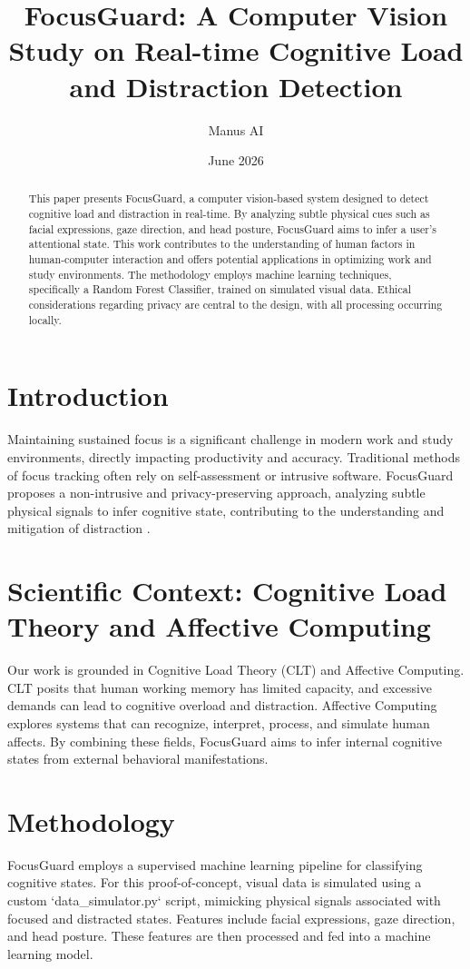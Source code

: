 \documentclass{article}
\title{FocusGuard: A Computer Vision Study on Real-time Cognitive Load and Distraction Detection}
\author{Manus AI}
\date{June 2026}
\begin{document}
\maketitle

\begin{abstract}
This paper presents FocusGuard, a computer vision-based system designed to detect cognitive load and distraction in real-time. By analyzing subtle physical cues such as facial expressions, gaze direction, and head posture, FocusGuard aims to infer a user's attentional state. This work contributes to the understanding of human factors in human-computer interaction and offers potential applications in optimizing work and study environments. The methodology employs machine learning techniques, specifically a Random Forest Classifier, trained on simulated visual data. Ethical considerations regarding privacy are central to the design, with all processing occurring locally.
\end{abstract}

\section{Introduction}
Maintaining sustained focus is a significant challenge in modern work and study environments, directly impacting productivity and accuracy. Traditional methods of focus tracking often rely on self-assessment or intrusive software. FocusGuard proposes a non-intrusive and privacy-preserving approach, analyzing subtle physical signals to infer cognitive state, contributing to the understanding and mitigation of distraction \cite{picard1997affective, sweller1988cognitive}.

\section{Scientific Context: Cognitive Load Theory and Affective Computing}
Our work is grounded in Cognitive Load Theory (CLT) and Affective Computing. CLT \cite{sweller1988cognitive} posits that human working memory has limited capacity, and excessive demands can lead to cognitive overload and distraction. Affective Computing \cite{picard1997affective} explores systems that can recognize, interpret, process, and simulate human affects. By combining these fields, FocusGuard aims to infer internal cognitive states from external behavioral manifestations.

\section{Methodology}
FocusGuard employs a supervised machine learning pipeline for classifying cognitive states. For this proof-of-concept, visual data is simulated using a custom `data_simulator.py` script, mimicking physical signals associated with focused and distracted states. Features include facial expressions, gaze direction, and head posture. These features are then processed and fed into a machine learning model.
\end{document}

